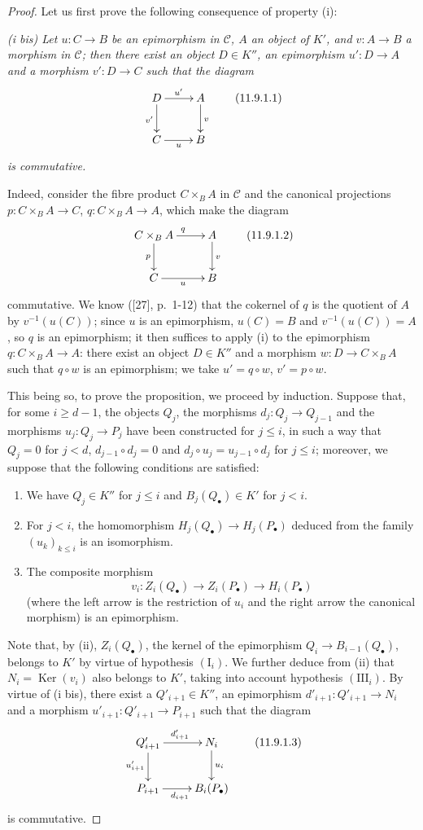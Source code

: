 \begin{proof}
Let us first prove the following consequence of property (i):

\emph{(i bis) Let $u:C\to B$ be an epimorphism in $\mathcal C$, $A$ an
object of $K'$, and $v:A\to B$ a morphism in $\mathcal C$; then there exist an
object $D\in K''$, an epimorphism $u':D\to A$ and a morphism $v':D\to C$
such that the diagram}
\[
\xymatrix{
D\ar[r]^{u'}\ar[d]_{v'} & A\ar[d]^{v}\\
C\ar[r]_{u} & B
}
\tag{11.9.1.1}\label{0.11.9.1.1}
\]
\emph{is commutative.}

Indeed, consider the fibre product $C\times_B A$ in $\mathcal C$ and the
canonical projections $p:C\times_B A\to C$, $q:C\times_B A\to A$, which make
the diagram
\[
\xymatrix{
C\times_B A\ar[r]^{q}\ar[d]_{p} & A\ar[d]^{v}\\
C\ar[r]_{u} & B
}
\tag{11.9.1.2}\label{0.11.9.1.2}
\]
commutative. We know ([27], p.~1-12) that the cokernel of $q$ is the
quotient of $A$ by $v^{-1}(u(C))$; since $u$ is an epimorphism, $u(C)=B$ and
$v^{-1}(u(C))=A$, so $q$ is an epimorphism; it then suffices to apply
(i) to the epimorphism $q:C\times_B A\to A$: there exist an object
$D\in K''$ and a morphism $w:D\to C\times_B A$ such that $q\circ w$ is an
epimorphism; we take $u'=q\circ w$, $v'=p\circ w$.

This being so, to prove the proposition, we proceed by induction.
Suppose that, for some $i\geq d-1$, the objects $Q_j$, the morphisms
$d_j:Q_j\to Q_{j-1}$ and the morphisms $u_j:Q_j\to P_j$ have been
constructed for $j\leq i$, in such a way that $Q_j=0$ for $j<d$,
$d_{j-1}\circ d_j=0$ and
$d_j\circ u_j=u_{j-1}\circ d_j$ for $j\leq i$; moreover, we suppose that
the following conditions are satisfied:
\begin{enumerate}
\item[$(\mathrm I_i)$] We have $Q_j\in K''$ for $j\leq i$ and
$B_j(Q_\bullet)\in K'$ for $j<i$.
\item[$(\mathrm{II}_i)$] For $j<i$, the homomorphism
$H_j(Q_\bullet)\to H_j(P_\bullet)$ deduced from the family $(u_k)_{k\leq i}$
is an isomorphism.
\item[$(\mathrm{III}_i)$] The composite morphism
\[
v_i:Z_i(Q_\bullet)\longrightarrow Z_i(P_\bullet)
\longrightarrow H_i(P_\bullet)
\]
(where the left arrow is the restriction of $u_i$ and the right arrow
the canonical morphism) is an epimorphism.
\end{enumerate}
Note that, by (ii), $Z_i(Q_\bullet)$, the kernel of the epimorphism
$Q_i\to B_{i-1}(Q_\bullet)$, belongs to $K'$ by virtue of hypothesis
$(\mathrm I_i)$. We further deduce from (ii) that
$N_i=\operatorname{Ker}(v_i)$ also belongs to $K'$, taking into account
hypothesis $(\mathrm{III}_i)$. By virtue of (i bis), there exist a
$Q'_{i+1}\in K''$, an epimorphism $d'_{i+1}:Q'_{i+1}\to N_i$ and a
morphism $u'_{i+1}:Q'_{i+1}\to P_{i+1}$ such that the diagram
\[
\xymatrix{
Q'_{i+1}\ar[r]^{d'_{i+1}}\ar[d]_{u'_{i+1}} &
N_i\ar[d]^{u_i}\\
P_{i+1}\ar[r]_{d_{i+1}} & B_i(P_\bullet)
}
\tag{11.9.1.3}\label{0.11.9.1.3}
\]
is commutative.


\end{proof}
